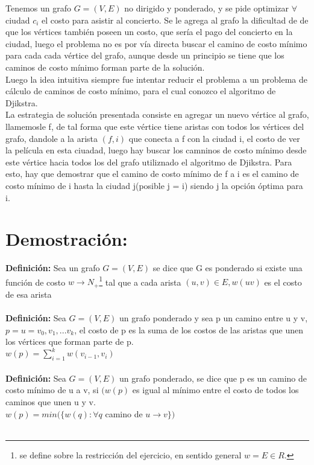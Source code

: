 \documentclass[12pt]{article}
\begin{document}
Tenemos un grafo $G=(V,E)$ no dirigido y ponderado, y se pide optimizar $\forall$ ciudad $c_i$ el costo para asistir al concierto. Se le agrega al grafo la dificultad de de que los v\'ertices tambi\'en poseen un costo, que ser\'ia el pago del concierto en la ciudad, luego el problema no es por v\'ia directa buscar el camino de costo m\'inimo para cada cada v\'ertice del grafo, aunque desde un principio se tiene que los caminos de costo m\'inimo forman parte de la soluci\'on.\\
Luego la idea intuitiva siempre fue intentar reducir el problema a un problema de c\'alculo de caminos de costo m\'inimo, para el cual conozco el algoritmo de Djikstra.\\
La estrategia de soluci\'on presentada consiste en agregar un nuevo v\'ertice al grafo, llamemosle f, de tal forma que este v\'ertice tiene aristas con todos los v\'ertices del grafo, dandole a la arista $(f,i)$ que conecta a f con la ciudad i, el costo de ver la pel\'icula en esta ciuadad, luego hay buscar los camninos de costo m\'inimo desde este v\'ertice hacia todos los del grafo utiliznado el algoritmo de Djikstra. Para esto, hay que demostrar que el camino de costo m\'inimo de f a i es el camino de costo m\'inimo de i hasta la ciudad j(posible j = i) siendo j la opci\'on \'optima para i.
 

\section{Demostración:}
\textbf{ Definici\'on:} Sea un grafo $G= (V, E)$ se dice que G es ponderado si existe una funci\'on de costo 
$w \rightarrow N_{+}$\footnote{se define sobre la restricci\'on del ejercicio, en sentido general $w = E \in R$.} tal que a cada
arista $(u, v) \in E, w(uv)$ es el costo de esa arista\\
\\



\textbf{Definici\'on:} Sea $G = (V, E)$  un grafo ponderado y sea p un camino entre u y v, $p = {u = v_0, v_1, ... v_k}$, el costo de p es la suma de los costos de las aristas que unen los v\'ertices que forman parte de p. \\
$w(p) = \sum\limits_{i=1}^{k} w(v_{i-1},v_i) $\\
\\



\textbf{Definici\'on:} Sea $G = (V, E)$ un grafo ponderado, se dice que p es un camino de costo m\'inimo de u a v, si $(w(p)$ es igual al m\'inimo entre el costo de todos los caminos que unen u y v.\\
$w(p) = min (\{w(q): \forall q$ camino de $u \rightarrow v\})$\\
\\
\end{document}
